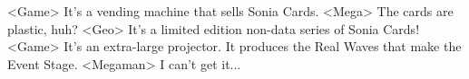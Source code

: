 <Game> It's a vending machine that sells Sonia Cards. 
<Mega> The cards are plastic, huh? 
<Geo> It's a limited edition non-data series of Sonia Cards! 
<Game> It's an extra-large projector. It produces the Real Waves that make the Event Stage. 
<Megaman> I can't get it... 
